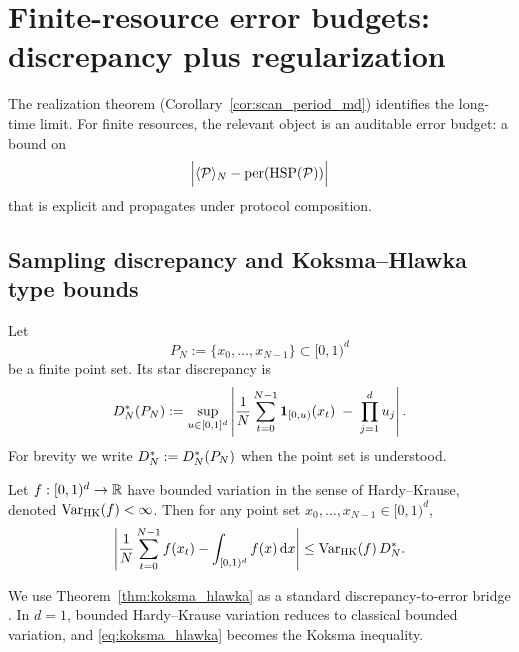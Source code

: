 
\section{Finite-resource error budgets: discrepancy plus regularization}
\label{sec:error_budgets}

The realization theorem (Corollary~\ref{cor:scan_period_md}) identifies the long-time limit. For finite resources, the relevant object is an auditable error budget: a bound on
\begin{equation}
\label{eq:finite_error_target}
\Big|\langle \mathcal{P} \rangle_N-\mathrm{per}(\mathrm{HSP}(\mathcal{P}))\Big|
\end{equation}
that is explicit and propagates under protocol composition.

\subsection{Sampling discrepancy and Koksma--Hlawka type bounds}
\label{sec:discrepancy_bounds}

Let
\begin{equation}
P_N := \{x_0,\dots,x_{N-1}\}\subset[0,1)^d
\end{equation}
be a finite point set. Its star discrepancy is
\begin{equation}
\label{eq:star_discrepancy}
D_N^\ast(P_N)
:=\sup_{u\in[0,1]^d}\left|
\frac{1}{N}\sum_{t=0}^{N-1}\mathbf{1}_{[0,u)}(x_t)
\;-\;\prod_{j=1}^d u_j
\right|.
\end{equation}
For brevity we write $D_N^\ast:=D_N^\ast(P_N)$ when the point set is understood.

\begin{theorem}
\label{thm:koksma_hlawka}
Let $f:[0,1)^d\to\mathbb{R}$ have bounded variation in the sense of Hardy--Krause, denoted $\mathrm{Var}_{\mathrm{HK}}(f)<\infty$. Then for any point set $x_0,\dots,x_{N-1}\in[0,1)^d$,
\begin{equation}
\label{eq:koksma_hlawka}
\left|\frac{1}{N}\sum_{t=0}^{N-1} f(x_t) - \int_{[0,1)^d} f(x)\,\mathrm{d} x \right|
\le \mathrm{Var}_{\mathrm{HK}}(f)\,D_N^\ast.
\end{equation}
\end{theorem}

\begin{remark}
\label{rem:koksma_refs}
We use Theorem~\ref{thm:koksma_hlawka} as a standard discrepancy-to-error bridge \cite{KuipersNiederreiter1974}. In $d=1$, bounded Hardy--Krause variation reduces to classical bounded variation, and \eqref{eq:koksma_hlawka} becomes the Koksma inequality.
\end{remark}

